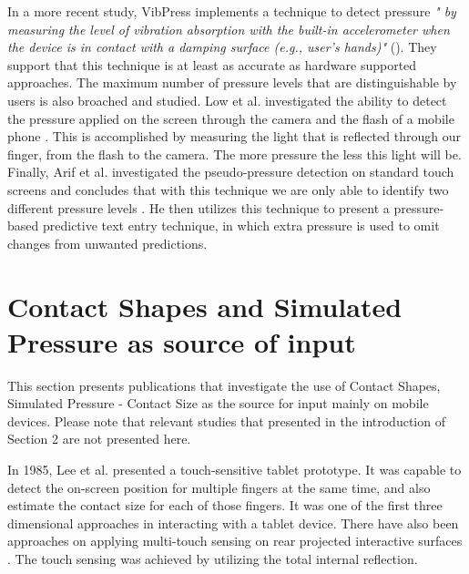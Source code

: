 In a more recent study, VibPress \cite{Hwang:2013:VEP:2493190.2493193} implements a technique to detect pressure \emph{" by measuring the level of vibration absorption with the built-in accelerometer when the device is in contact with a damping surface (e.g., user's hands)"} (\cite{Hwang:2013:VEP:2493190.2493193}). They support that this technique is at least as accurate as hardware supported approaches. The maximum number of pressure levels that are distinguishable by users is also broached and studied.
Low et al. investigated the ability to detect the pressure applied on the screen through the camera and the flash of a mobile phone \cite{Low:2014:PDM:2582051.2582062}. This is accomplished by measuring the light that is reflected through our finger, from the flash to the camera. The more pressure the less this light will be.
Finally, Arif et al. investigated the pseudo-pressure detection on standard touch screens and concludes that with this technique we are only able to identify two different pressure levels \cite{Arif:2013:PDU:2541016.2541024}. He then utilizes this technique to present a pressure-based predictive text entry technique, in which extra pressure is used to omit changes from unwanted predictions.



\section{Contact Shapes and Simulated Pressure as source of input}
\label{sec:simulatedPressure}

This section presents publications that investigate the use of Contact Shapes, Simulated Pressure - Contact Size as the source for input mainly on mobile devices. Please note that relevant studies that presented in the introduction of Section 2 are not presented here.

In 1985, Lee et al. \cite{Lee:1985:MTD:1165385.317461} presented a touch-sensitive tablet prototype. It was capable to detect the on-screen position for multiple fingers at the same time, and also estimate the contact size for each of those fingers. It was one of the first three dimensional approaches in interacting with a tablet device.  There have also been approaches on applying multi-touch sensing on rear projected interactive surfaces \cite{Han:2005:LMS:1095034.1095054}. The touch sensing was achieved by utilizing the total internal reflection.

